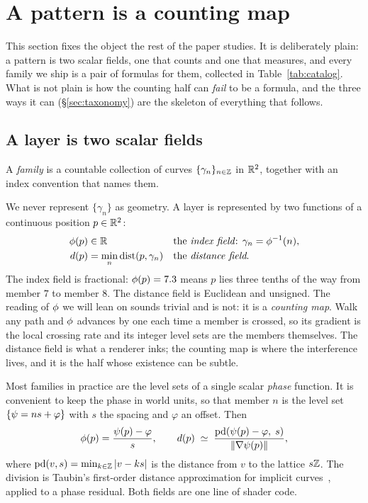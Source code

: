 \section{A pattern is a counting map}
\label{sec:field}

This section fixes the object the rest of the paper studies. It is deliberately
plain: a pattern is two scalar fields, one that counts and one that measures,
and every family we ship is a pair of formulas for them, collected in
Table~\ref{tab:catalog}. What is not plain is how the counting half can
\emph{fail} to be a formula, and the three ways it can
(\S\ref{sec:taxonomy}) are the skeleton of everything that follows.

\subsection{A layer is two scalar fields}

\begin{definition}[Family]
A \emph{family} is a countable collection of curves $\{\gamma_n\}_{n\in\mathbb{Z}}$ in
$\mathbb{R}^2$, together with an index convention that names them.
\end{definition}

We never represent $\{\gamma_n\}$ as geometry. A layer is represented by two
functions of a continuous position $p\in\mathbb{R}^2$:
\begin{align}
  \phi(p) &\in \mathbb{R} && \text{the \emph{index field}: } \gamma_n=\phi^{-1}(n),\\
  d(p) &= \min_{n} \mathrm{dist}(p,\gamma_n) && \text{the \emph{distance field}.}
\end{align}
The index field is fractional: $\phi(p)=7.3$ means $p$ lies three tenths of the
way from member $7$ to member $8$. The distance field is Euclidean and unsigned.
The reading of $\phi$ we will lean on sounds trivial and is not: it is a
\emph{counting map}. Walk any path and $\phi$ advances by one each time a
member is crossed, so its gradient is the local crossing rate and its integer
level sets are the members themselves. The distance field is what a renderer
inks; the counting map is where the interference lives, and it is the half
whose existence can be subtle.

Most families in practice are the level sets of a single scalar \emph{phase}
function. It is convenient to keep the phase in world units, so that member $n$ is
the level set $\{\psi = ns + \varphi\}$ with $s$ the spacing and $\varphi$ an
offset. Then
\begin{equation}
  \phi(p) = \frac{\psi(p)-\varphi}{s},
  \qquad
  d(p) \;\simeq\; \frac{\mathrm{pd}\!\left(\psi(p)-\varphi,\; s\right)}{\lVert\nabla\psi(p)\rVert},
  \label{eq:eikonal}
\end{equation}
where $\mathrm{pd}(v,s)=\min_{k\in\mathbb{Z}}|v-ks|$ is the distance from $v$ to the
lattice $s\mathbb{Z}$. The division is Taubin's first-order distance
approximation for implicit curves~\cite{Taubin1994Distance}, applied to a phase
residual. Both fields are one line of shader code.

